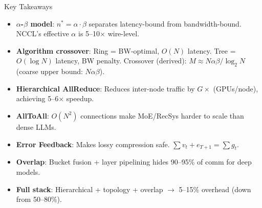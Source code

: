 \documentclass[aspectratio=169, 12pt]{beamer}
\begin{document}
\begin{frame}{Key Takeaways}

\scriptsize
\begin{itemize}\setlength\itemsep{0pt}
  \item \textbf{$\alpha$-$\beta$ model}: $n^* = \alpha \cdot \beta$ separates latency-bound from bandwidth-bound. NCCL's effective $\alpha$ is 5--10$\times$ wire-level.
  \item \textbf{Algorithm crossover}: Ring = BW-optimal, $O(N)$ latency. Tree = $O(\log N)$ latency, BW penalty. Crossover (derived): $M \approx N\alpha\beta/\log_2 N$ (coarse upper bound: $N\alpha\beta$).
  \item \textbf{Hierarchical AllReduce}: Reduces inter-node traffic by $G\times$ (GPUs/node), achieving 5--6$\times$ speedup.
  \item \textbf{AllToAll}: $O(N^2)$ connections make MoE/RecSys harder to scale than dense LLMs.
  \item \textbf{Error Feedback}: Makes lossy compression safe. $\sum v_t + e_{T+1} = \sum g_t$.
  \item \textbf{Overlap}: Bucket fusion + layer pipelining hides 90--95\% of comm for deep models.
  \item \textbf{Full stack}: Hierarchical + topology + overlap $\to$ 5--15\% overhead (down from 50--80\%).
\end{itemize}

\end{frame}
\end{document}
